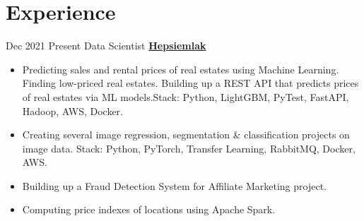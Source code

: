 \documentclass[letterpaper]{DS_class_file} %
\begin{document}
\makeprofile %




\section{Experience}

\begin{twenty}
    \twentyitem
		{Dec 2021}
		{Present}
		{\hspace{0.3cm}Data Scientist}
		{\href{https://www.hepsiemlak.com/}{\textbf{Hepsiemlak}}}
		{}
		{\begin{itemize}
                \item Predicting sales and rental prices of real estates using Machine Learning. Finding low-priced real estates. Building up a REST API that predicts prices of real estates via ML models.\newline Stack: Python, LightGBM, PyTest, FastAPI, Hadoop, AWS, Docker.
			\item Creating several image regression, segmentation \& classification projects on image data. \newline Stack: Python, PyTorch, Transfer Learning, RabbitMQ, Docker, AWS.
                \item Building up a Fraud Detection System for Affiliate Marketing project.
                \item Computing price indexes of locations using Apache Spark.
			

\end{itemize}}
\end{twenty}
\end{document}

